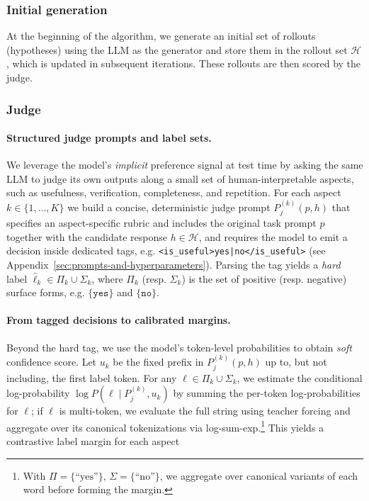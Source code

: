 \documentclass[letterpaper]{article} %
\begin{document}
\subsubsection{Initial generation}
At the beginning of the algorithm, we generate an initial set of rollouts (hypotheses) using the LLM as the generator and store them in the rollout set $\mathcal{H}$, which is updated in subsequent iterations. These rollouts are then scored by the judge.


\subsubsection{Judge}


\paragraph{Structured judge prompts and label sets.} We leverage the model’s \emph{implicit} preference signal at test time by asking the same LLM to judge its own outputs along a small set of human-interpretable aspects, such as usefulness, verification, completeness, and repetition. For each aspect \(k\in\{1,\dots,K\}\) we build a concise, deterministic judge prompt \(P^{(k)}_j(p,h)\) that specifies an aspect-specific rubric and includes the original task prompt \(p\) together with the candidate response \(h\in\mathcal{H}\), and requires the model to emit a decision inside dedicated tags, e.g. \texttt{<is\_useful>yes|no</is\_useful>} (see Appendix~\ref{sec:prompts-and-hyperparameters}). Parsing the tag yields a \emph{hard} label \(\hat\ell_k\in\Pi_k\cup\Sigma_k\), where \(\Pi_k\) (resp. \(\Sigma_k\)) is the set of positive (resp. negative) surface forms, e.g. \(\{\texttt{yes}\}\) and \(\{\texttt{no}\}\).

\paragraph{From tagged decisions to calibrated margins.} Beyond the hard tag, we use the model’s token-level probabilities to obtain \emph{soft} confidence score. Let \(u_k\) be the fixed prefix in \(P^{(k)}_j(p,h)\) up to, but not including, the first label token. For any \(\ell\in\Pi_k\cup\Sigma_k\), we estimate the conditional log-probability \(\log P(\ell\mid P^{(k)}_j,u_k)\) by summing the per-token log-probabilities for \(\ell\); if \(\ell\) is multi-token, we evaluate the full string using teacher forcing and aggregate over its canonical tokenizations via log-sum-exp.\footnote{With \(\Pi=\{\text{``yes''}\},\,\Sigma=\{\text{``no''}\}\), we aggregate over canonical variants of each word before forming the margin.} This yields a contrastive label margin for each aspect
\end{document}
